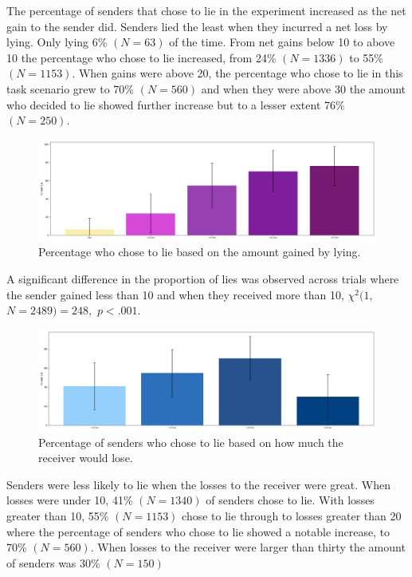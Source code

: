 \documentclass[man, floatsintext]{apa7}
\begin{document}
The percentage of senders that chose to lie in the experiment increased as the net gain to the sender did.  Senders lied the least when they incurred a net loss by lying. Only lying 6\% $(N = 63)$ of the time. From net gains below 10 to above 10 the percentage who chose to lie increased, from 24\% $(N = 1336)$ to 55\% $(N = 1153)$. When gains were above 20, the percentage who chose to lie in this task scenario grew to 70\% $(N = 560)$ and when they were above 30 the amount who decided to lie showed further increase but to a lesser extent 76\% $(N = 250)$.

\begin{figure}[H]
	\includegraphics[width=\linewidth]{../plots/RESPONSE/NetGainLie.png}
	\caption{Percentage who chose to lie based on the amount gained by lying.}
	\label{fig:NetGainLie}
\end{figure}

A significant difference in the proportion of lies was observed across trials where the sender gained less than 10 and when they received more than 10, $\chi^2(1,$ $N=2489) = 248,$ $p<.001$. 

\begin{figure}[H]
	\includegraphics[width=\linewidth]{../plots/RESPONSE/NetLossLie.png}
	\caption{Percentage of senders who chose to lie based on how much the receiver would lose.}
	\label{fig:NetLossLie}
\end{figure}

Senders were less likely to lie when the losses to the receiver were great. When losses were under 10,  41\% $(N = 1340)$ of senders chose to lie. With losses greater than 10, 55\%  $(N = 1153)$ chose to lie through to losses greater than 20 where the percentage of senders who chose to lie showed a notable increase, to 70\%  $(N = 560)$. When losses to the receiver were larger than thirty the amount of senders was 30\% $(N = 150)$
\end{document}

